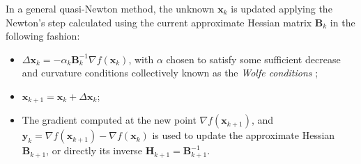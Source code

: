 In a general quasi-Newton method, the unknown \(\bm{x}_{k}\) is
updated applying the Newton's step calculated using the current
approximate Hessian matrix \(\bm{B}_{k}\) in the following fashion:
\begin{itemize}
 \item \(\Delta \bm{x}_{k} = -\alpha_{k}\bm{B}_{k}^{-1}\nabla
       f(\bm{x}_{k})\), with \(\alpha\) chosen to satisfy some
       sufficient decrease and curvature conditions collectively known
       as the \textit{Wolfe conditions} \cite[p.~34]{nocedal&wright};

 \item \(\bm{x}_{k+1} = \bm{x}_{k} + \Delta\bm{x}_{k}\);

 \item The gradient computed at the new point \(\nabla
       f(\bm{x}_{k+1})\), and \(\bm{y}_{k} = \nabla f(\bm{x}_{k+1}) -
       \nabla f(\bm{x}_{k})\) is used to update the approximate Hessian
       \(\bm{B}_{k+1}\), or directly its inverse
       \(\bm{H}_{k+1} = \bm{B}_{k+1}^{-1}\).
\end{itemize}

